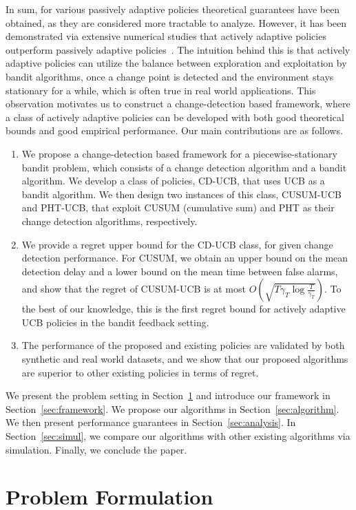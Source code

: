 \documentclass[letterpaper]{article}
\begin{document}
In sum, for various passively adaptive policies theoretical guarantees have been obtained, as they are considered more tractable to analyze. However, it has been demonstrated via extensive numerical studies that actively adaptive policies outperform passively adaptive policies~\cite{mellor2013thompson}. The intuition behind this is that actively adaptive policies can utilize the balance between exploration and exploitation by bandit algorithms, once a change point is detected and the environment stays stationary for a while, which is often true in real world applications. This observation motivates us to construct a change-detection based framework, where a class of actively adaptive policies can be developed with both good theoretical bounds and good empirical performance. Our main contributions are as follows.
\begin{enumerate}
 \item We propose a change-detection based framework for a piecewise-stationary bandit problem, which consists of a change detection algorithm and a bandit algorithm. We develop a class of policies, CD-UCB, that uses UCB as a bandit algorithm. We then design two instances of this class, CUSUM-UCB and PHT-UCB, that exploit CUSUM (cumulative sum) and PHT as their change detection algorithms, respectively.
 \item
We provide a regret upper bound for the CD-UCB class, for given change detection performance. For CUSUM, we obtain an upper bound on the mean detection delay and a lower bound on the mean time between false alarms, and show that the regret of CUSUM-UCB is at most $O(\sqrt{T\gamma_T\log{\frac{T}{\gamma_T}}})$. To the best of our knowledge, this is the first regret bound for actively adaptive UCB policies in the bandit feedback setting.
 \item
The performance of the proposed and existing policies are validated by both synthetic and real world datasets, and we show that our proposed algorithms are superior to other existing policies in terms of regret.
 \end{enumerate}
We present the problem setting in Section~\ref{sec:problemform} and introduce our framework in Section~\ref{sec:framework}. We propose our algorithms in Section~\ref{sec:algorithm}. We then present performance guarantees in Section~\ref{sec:analysis}. In Section~\ref{sec:simul}, we compare our algorithms with other existing algorithms via simulation. Finally, we conclude the paper. %
\section{Problem Formulation}\label{sec:problemform}
\end{document}
